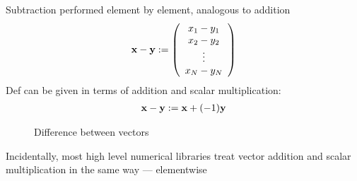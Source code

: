 \documentclass[letterpaper,10pt,english]{jupyterBook}
\begin{document}
\sphinxAtStartPar
Subtraction performed element by element, analogous to addition
\begin{equation*}
\begin{split}
%
{\bf x} - {\bf y} 
:=
\left(
\begin{array}{c}
x_1 - y_1 \\
x_2 - y_2 \\
\vdots \\
x_N - y_N
\end{array}
\right)
%
\end{split}
\end{equation*}
\sphinxAtStartPar
Def can be given in terms of addition and scalar multiplication:
\begin{equation*}
\begin{split}
%
{\bf x} - {\bf y} := {\bf x} + (-1) {\bf y} 
%
\end{split}
\end{equation*}
\begin{figure}[htbp]
\centering
\capstart

\noindent{}
\caption{Difference between vectors}\label{\detokenize{05.linear_algebra:f-vec-minus}}\end{figure}

\sphinxAtStartPar
Incidentally, most high level numerical libraries treat vector addition
and scalar multiplication in the same way — element\sphinxhyphen{}wise
\end{document}
